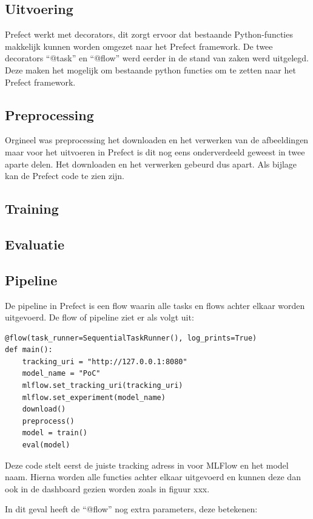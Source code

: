 \subsection{Uitvoering}
Prefect werkt met decorators, dit zorgt ervoor dat bestaande Python-functies makkelijk kunnen worden omgezet naar het Prefect framework. De twee decorators ``@task'' en ``@flow'' werd  eerder in de stand van zaken werd uitgelegd.
Deze maken het mogelijk om bestaande python functies om te zetten naar het Prefect framework.
\subsection{Preprocessing}
Orgineel was preprocessing het downloaden en het verwerken van de afbeeldingen maar voor het uitvoeren in Prefect is dit nog eens onderverdeeld geweest in twee aparte delen.
Het downloaden en het verwerken gebeurd dus apart. Als bijlage kan de Prefect code te zien zijn.
\subsection{Training}

\subsection{Evaluatie}

\subsection{Pipeline}
De pipeline in Prefect is een flow waarin alle tasks en flows achter elkaar worden uitgevoerd. De flow of pipeline ziet er als volgt uit:
\begin{verbatim}
@flow(task_runner=SequentialTaskRunner(), log_prints=True)
def main():
    tracking_uri = "http://127.0.0.1:8080"
    model_name = "PoC"
    mlflow.set_tracking_uri(tracking_uri)
    mlflow.set_experiment(model_name)
    download()
    preprocess()
    model = train()
    eval(model)
\end{verbatim}

Deze code stelt eerst de juiste tracking adress in voor MLFlow en het model naam.
Hierna worden alle functies achter elkaar uitgevoerd en kunnen deze dan ook in de dashboard gezien worden zoals in figuur xxx.

In dit geval heeft de ``@flow'' nog extra parameters, deze betekenen:


